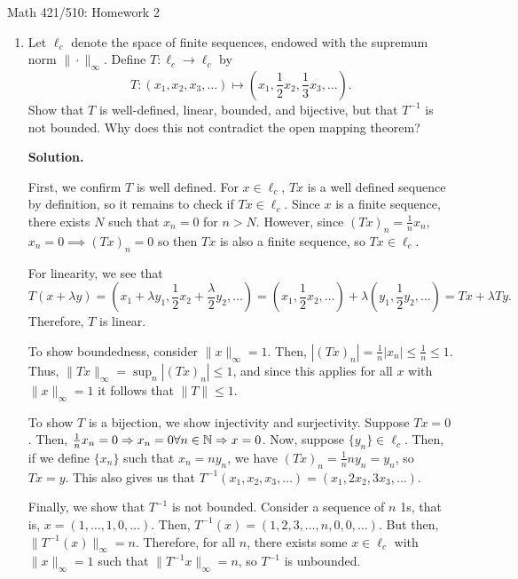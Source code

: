 \documentclass[11pt]{article}
\begin{document}
\begin{center}
{\LARGE Math 421/510: Homework 2}
\end{center}

\vspace{1.6em}

\begin{enumerate}
\item Let $\ell_c$ denote the space of finite sequences, endowed with the supremum norm $\|\cdot\|_\infty$.
Define $T:\ell_c \to \ell_c$ by
\[
T:(x_1,x_2,x_3,\ldots)\mapsto \left(x_1,\frac{1}{2}x_2,\frac{1}{3}x_3,\ldots\right).
\]
Show that $T$ is well-defined, linear, bounded, and bijective, but that $T^{-1}$ is not bounded. Why does this not contradict the open mapping theorem?


\textbf{Solution.}

First, we confirm $T$ is well defined. 
For $x \in \ell_{c}$, $Tx$ is a well defined sequence by definition, so it remains to check if $Tx \in \ell_c$.
Since $x$ is a finite sequence, there exists $N$ such that $x_n = 0$ for $n > N$.
However, since $(Tx)_n = \frac{1}{n} x_n$, $x_n = 0 \implies (Tx)_n = 0$ so then $Tx$ is also a finite sequence, so $Tx \in \ell_c$.

For linearity, we see that
\[
T(x + \lambda y) = (x_1 + \lambda y_1, \frac{1}{2} x_2 + \frac{\lambda}{2} y_2, \ldots) = (x_1, \frac{1}{2} x_2, \ldots) + \lambda (y_1, \frac{1}{2} y_2, \ldots) = Tx + \lambda Ty
.\] 
Therefore, $T$ is linear.

To show boundedness, consider $\|x\|_{\infty} = 1$.
Then, $|(Tx)_n| = \frac{1}{n} |x_n| \leq \frac{1}{n} \leq 1$.
Thus, $\|Tx\|_{\infty} = \sup_{n}|(Tx)_n| \leq 1$, and since this applies for all $x$ with $\|x\|_{\infty} = 1$ it follows that $\|T\| \leq 1$.


To show $T$ is a bijection, we show injectivity and surjectivity.
Suppose $Tx = 0$.
Then, $\frac{1}{n}x_n = 0 \Rightarrow x_n = 0 \forall n \in \mathbb{N} \Rightarrow x = 0$.
Now, suppose $\{y_n\} \in \ell_{c}$.
Then, if we define $\{x_n\} $ such that $x_n = ny_n$, we have $(Tx)_{n} = \frac{1}{n} n y_n = y_n$, so $Tx=y$.
This also gives us that $T^{-1}(x_1, x_2, x_3, \ldots) = (x_1, 2x_2, 3x_3, \ldots)$.

Finally, we show that $T^{-1}$ is not bounded.
Consider a sequence of $n$ 1s, that is, $x = (1, \ldots, 1, 0, \ldots)$.
Then, $T^{-1}(x) = (1, 2, 3, \ldots, n, 0 ,0, \ldots)$.
But then, $\|T^{-1}(x)\|_{\infty} = n$.
Therefore, for all $n$, there exists some $x \in \ell_{c}$ with $\|x\|_{\infty} = 1$ such that $\|T^{-1}x\|_{\infty} = n$, so $T^{-1}$ is unbounded.


\end{enumerate}
\end{document}
